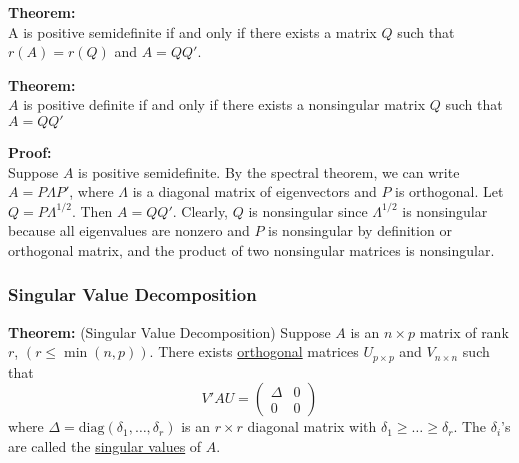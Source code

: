 \documentclass[12pt]{article}
\numberwithin{equation}{section}
\begin{document}
\textbf{Theorem:} \\
A is positive semidefinite if and only if there exists a matrix $Q$ such that $r(A) = r(Q)$ and $A = QQ'$.

\textbf{Theorem:}\\
$A$ is positive definite if and only if there exists a nonsingular matrix $Q$ such that $A = QQ'$

\textbf{Proof:} \\
Suppose $A$ is positive semidefinite. By the spectral theorem, we can write $A = P \Lambda P'$, where $\Lambda$ is a diagonal matrix of eigenvectors and $P$ is orthogonal. Let $Q = P \Lambda^{1/2}$. Then $A = QQ'$. Clearly, $Q$ is nonsingular since $\Lambda^{1/2}$ is nonsingular because all eigenvalues are nonzero and $P$ is nonsingular by definition or orthogonal matrix, and the product of two nonsingular matrices is nonsingular.

\subsubsection{Singular Value Decomposition}
\textbf{Theorem:} (Singular Value Decomposition)
Suppose $A$ is an $n \times p$ matrix of rank $r$, $(r \le \min(n, p))$. There exists \underline{orthogonal} matrices $U_{p \times p}$ and 
$V_{n \times n}$ such that
\begin{equation*}
  V'AU = 
    \begin{pmatrix} 
      \Delta & 0 \\
      0 & 0
    \end{pmatrix}
\end{equation*}
where $\Delta = \text{diag}(\delta_1, \ldots, \delta_r)$ is an $r \times r$ diagonal matrix with $\delta_1 \ge \ldots \ge \delta_r$. The $\delta_i$'s are called the \underline{singular values} of $A$.
\end{document}
